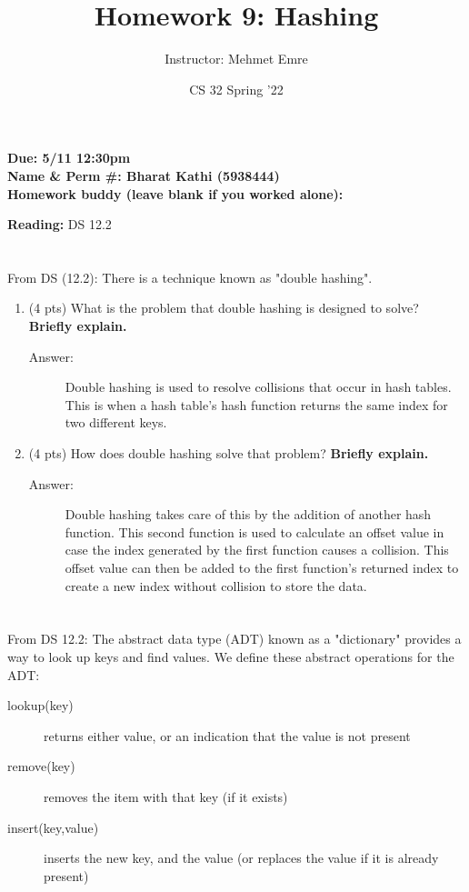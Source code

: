 \documentclass[11pt]{article}
\author{Instructor: Mehmet Emre}
\date{CS 32 Spring '22}
\title{Homework 9: Hashing}
\begin{document}
\maketitle
\textbf{Due: 5/11 12:30pm} \\ 
\vspace{1em}
\textbf{Name \& Perm \#: Bharat Kathi (5938444)} \\ 
\textbf{Homework buddy (leave blank if you worked alone):}

\textbf{Reading:} DS 12.2

\section{}
\label{sec:org07b2aca}
From DS (12.2): There is a technique known as "double hashing".
\begin{enumerate}
\item (4 pts) What is the problem that double hashing is designed to solve?
\textbf{Briefly explain.}
\begin{description}
    \item[Answer:] Double hashing is used to resolve collisions that occur in hash tables. This is when a hash table's hash function returns the same index for two different keys.
\end{description}
\vspace{4em}
\item (4 pts) How does double hashing solve that problem? \textbf{Briefly explain.}
\begin{description}
    \item[Answer:] Double hashing takes care of this by the addition of another hash function. This second function is used to calculate an offset value in case the index generated by the first function causes a collision. This offset value can then be added to the first function's returned index to create a new index without collision to store the data.
\end{description}
\vspace{4em}
\end{enumerate}
\section{}
\label{sec:orgbd9e3a4}
From DS 12.2: The abstract data type (ADT) known as a "dictionary" provides a
way to look up keys and find values. We define these abstract operations for
the ADT:
\begin{description}
\item[{lookup(key)}] returns either value, or an indication that the value is not
present
\item[{remove(key)}] removes the item with that key (if it exists)
\item[{insert(key,value)}] inserts the new key, and the value (or replaces the
value if it is already present)
\end{description}
\end{document}
